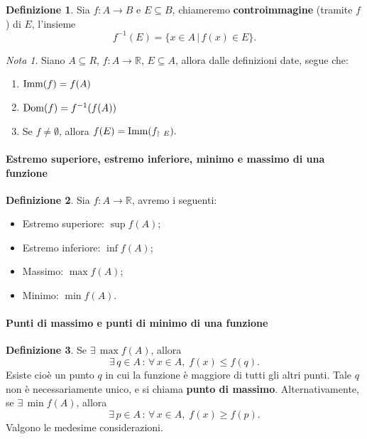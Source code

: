 \documentclass{article}
\theoremstyle{plain}
\theoremstyle{definition}
\newtheorem{defn}{Definizione}[section]
\theoremstyle{remark}
\newtheorem{note}{Nota}
\begin{document}
\vspace{10pt}

\begin{bxthm}
\begin{defn}
    Sia $f:A\to B$ e $E\subseteq B$, chiameremo \textbf{controimmagine} (tramite $f$) di $E$, 
    l'insieme \[f^{-1}(E)=\{x\in A\, |\, f(x)\in E\}.\]
\end{defn}
\end{bxthm}

\vspace{10pt}

\begin{note}
    Siano $A\subseteq{R}$, $f:A\to\mathbb{R}$, $E\subseteq A$, allora dalle definizioni date, segue che:
    \begin{enumerate}
        \item $\textup{Imm}(f)=f(A)$
        \item $\textup{Dom}(f)=f^{-1}(f(A))$
        \item Se $f\neq\emptyset$, allora $f(E)=\textup{Imm}(f_{\upharpoonright \ E}).$
    \end{enumerate}
\end{note}

\vspace{10pt}

\paragraph{Estremo superiore, estremo inferiore, minimo e massimo di una funzione}
\begin{bxthm}
\begin{defn}
    Sia $f:A\to\mathbb{R}$, avremo i seguenti:
    \begin{itemize}
        \item Estremo superiore: $\sup f(A)$;
        \item Estremo inferiore: $\inf f(A)$;
        \item Massimo: $\max f(A)$;
        \item Minimo: $\min f(A)$.
\end{itemize}
\end{defn}
\end{bxthm}

\vspace{10pt}

\paragraph{Punti di massimo e punti di minimo di una funzione}
\begin{bxthm}
\begin{defn}
    Se $\exists\,\max f(A)$, allora 
    \[\exists\, q\in A\,:\,\forall\, x\in A,\;f(x)\leq f(q).\]
    Esiste cioè un punto $q$ in cui la funzione è maggiore di tutti gli altri punti.
    Tale $q$ non è necessariamente unico, e si chiama \textbf{punto di massimo}.  
    Alternativamente, se $\exists\,\min f(A)$, allora 
    \[\exists\, p\in A\,:\,\forall\, x\in A,\;f(x)\geq f(p).\]
    Valgono le medesime considerazioni.
\end{defn}
\end{bxthm}
\end{document}
